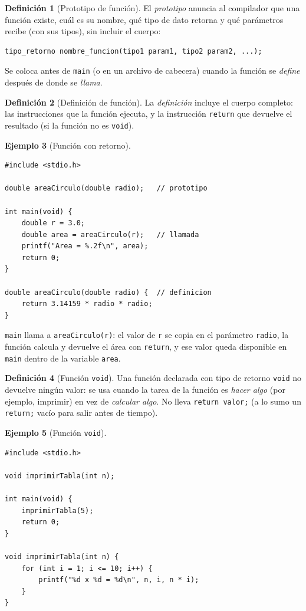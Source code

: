 \documentclass[11pt,letterpaper]{article}
\theoremstyle{definition}
\newtheorem{definicion}{Definición}[section]
\newtheorem{ejemplo}[definicion]{Ejemplo}
\begin{document}
\begin{definicion}[Prototipo de función]
El \emph{prototipo} anuncia al compilador que una función existe, cuál es su nombre, qué tipo de
dato retorna y qué parámetros recibe (con sus tipos), sin incluir el cuerpo:
\begin{lstlisting}
tipo_retorno nombre_funcion(tipo1 param1, tipo2 param2, ...);
\end{lstlisting}
Se coloca antes de \texttt{main} (o en un archivo de cabecera) cuando la función se \emph{define}
después de donde se \emph{llama}.
\end{definicion}

\begin{definicion}[Definición de función]
La \emph{definición} incluye el cuerpo completo: las instrucciones que la función ejecuta, y la
instrucción \texttt{return} que devuelve el resultado (si la función no es \texttt{void}).
\end{definicion}

\begin{ejemplo}[Función con retorno]
\begin{lstlisting}
#include <stdio.h>

double areaCirculo(double radio);   // prototipo

int main(void) {
    double r = 3.0;
    double area = areaCirculo(r);   // llamada
    printf("Area = %.2f\n", area);
    return 0;
}

double areaCirculo(double radio) {  // definicion
    return 3.14159 * radio * radio;
}
\end{lstlisting}
\texttt{main} llama a \texttt{areaCirculo(r)}: el valor de \texttt{r} se copia en el parámetro
\texttt{radio}, la función calcula y devuelve el área con \texttt{return}, y ese valor queda
disponible en \texttt{main} dentro de la variable \texttt{area}.
\end{ejemplo}

\begin{definicion}[Función \texttt{void}]
Una función declarada con tipo de retorno \texttt{void} no devuelve ningún valor: se usa cuando la
tarea de la función es \emph{hacer algo} (por ejemplo, imprimir) en vez de \emph{calcular algo}. No
lleva \texttt{return valor;} (a lo sumo un \texttt{return;} vacío para salir antes de tiempo).
\end{definicion}

\begin{ejemplo}[Función \texttt{void}]
\begin{lstlisting}
#include <stdio.h>

void imprimirTabla(int n);

int main(void) {
    imprimirTabla(5);
    return 0;
}

void imprimirTabla(int n) {
    for (int i = 1; i <= 10; i++) {
        printf("%d x %d = %d\n", n, i, n * i);
    }
}
\end{lstlisting}
\end{ejemplo}
\end{document}
